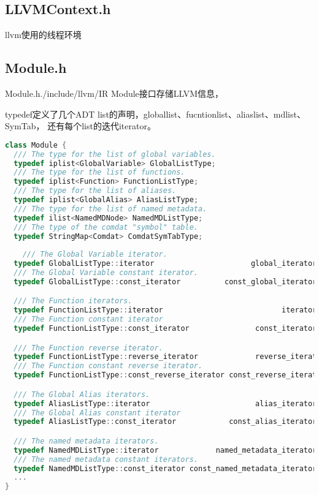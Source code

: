 \documentclass{ctexart}
\begin{document}
\subsection{LLVMContext.h}
llvm使用的线程环境


\subsection{Module.h}
	
	
Module.h{./include/llvm/IR}	
Module接口存储LLVM信息，

typedef定义了几个ADT list的声明，globallist、fucntionlist、aliaslist、mdlist、SymTab，
还有每个list的迭代iterator。
\begin{lstlisting}[language=C++]
class Module {
  /// The type for the list of global variables.
  typedef iplist<GlobalVariable> GlobalListType;
  /// The type for the list of functions.
  typedef iplist<Function> FunctionListType;
  /// The type for the list of aliases.
  typedef iplist<GlobalAlias> AliasListType;
  /// The type for the list of named metadata.
  typedef ilist<NamedMDNode> NamedMDListType;
  /// The type of the comdat "symbol" table.
  typedef StringMap<Comdat> ComdatSymTabType;
  
    /// The Global Variable iterator.
  typedef GlobalListType::iterator                      global_iterator;
  /// The Global Variable constant iterator.
  typedef GlobalListType::const_iterator          const_global_iterator;

  /// The Function iterators.
  typedef FunctionListType::iterator                           iterator;
  /// The Function constant iterator
  typedef FunctionListType::const_iterator               const_iterator;

  /// The Function reverse iterator.
  typedef FunctionListType::reverse_iterator             reverse_iterator;
  /// The Function constant reverse iterator.
  typedef FunctionListType::const_reverse_iterator const_reverse_iterator;

  /// The Global Alias iterators.
  typedef AliasListType::iterator                        alias_iterator;
  /// The Global Alias constant iterator
  typedef AliasListType::const_iterator            const_alias_iterator;

  /// The named metadata iterators.
  typedef NamedMDListType::iterator             named_metadata_iterator;
  /// The named metadata constant iterators.
  typedef NamedMDListType::const_iterator const_named_metadata_iterator;
  ...
}
\end{lstlisting}
\end{document}
